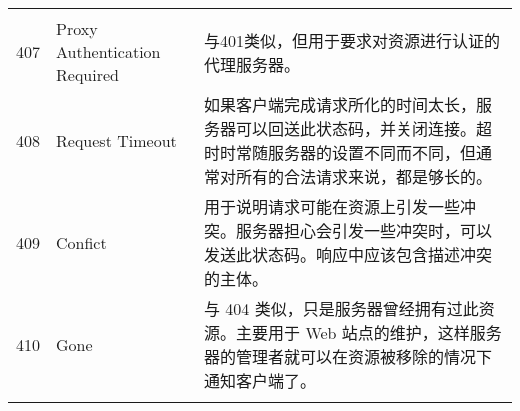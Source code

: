 \begin{longtable}[]{@{}cll@{}}
\begin{minipage}[t]{0.30\columnwidth}
\end{minipage}\tabularnewline
\begin{minipage}[t]{0.32\columnwidth}\centering\strut
407\strut
\end{minipage} & \begin{minipage}[t]{0.30\columnwidth}\raggedright\strut
Proxy Authentication Required\strut
\end{minipage} & \begin{minipage}[t]{0.30\columnwidth}\raggedright\strut
与401类似，但用于要求对资源进行认证的代理服务器。\strut
\end{minipage}\tabularnewline
\begin{minipage}[t]{0.32\columnwidth}\centering\strut
408\strut
\end{minipage} & \begin{minipage}[t]{0.30\columnwidth}\raggedright\strut
Request Timeout\strut
\end{minipage} & \begin{minipage}[t]{0.30\columnwidth}\raggedright\strut
如果客户端完成请求所化的时间太长，服务器可以回送此状态码，并关闭连接。超时时常随服务器的设置不同而不同，但通常对所有的合法请求来说，都是够长的。\strut
\end{minipage}\tabularnewline
\begin{minipage}[t]{0.32\columnwidth}\centering\strut
409\strut
\end{minipage} & \begin{minipage}[t]{0.30\columnwidth}\raggedright\strut
Confict\strut
\end{minipage} & \begin{minipage}[t]{0.30\columnwidth}\raggedright\strut
用于说明请求可能在资源上引发一些冲突。服务器担心会引发一些冲突时，可以发送此状态码。响应中应该包含描述冲突的主体。\strut
\end{minipage}\tabularnewline
\begin{minipage}[t]{0.32\columnwidth}\centering\strut
410\strut
\end{minipage} & \begin{minipage}[t]{0.30\columnwidth}\raggedright\strut
Gone\strut
\end{minipage} & \begin{minipage}[t]{0.30\columnwidth}\raggedright\strut
与 404 类似，只是服务器曾经拥有过此资源。主要用于 Web
站点的维护，这样服务器的管理者就可以在资源被移除的情况下通知客户端了。\strut
\end{minipage}\tabularnewline
\begin{minipage}[t]{0.32\columnwidth}\centering\strut

\end{minipage}
\end{longtable}
